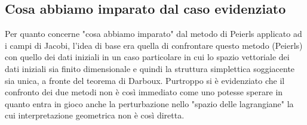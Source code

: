 \documentclass[Cascione]{subfiles}
\begin{document}
		\subsection{Cosa abbiamo imparato dal caso evidenziato}
		Per quanto concerne "cosa abbiamo imparato" dal metodo di Peierls applicato ad i campi di Jacobi, l'idea di base era quella di confrontare questo metodo (Peierls) con quello dei dati iniziali in un caso particolare in cui lo spazio vettoriale dei dati iniziali sia finito dimensionale e quindi la struttura simplettica soggiacente sia unica, a fronte del teorema di Darboux. 
		Purtroppo si è evidenziato che il confronto dei due metodi non è così immediato come uno potesse sperare in quanto entra in gioco anche la perturbazione nello "spazio delle lagrangiane" la cui interpretazione geometrica non è così diretta. 
\end{document}
